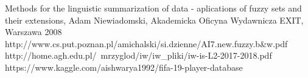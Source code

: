 \documentclass{classrep}
\begin{document}
	

\begin{thebibliography}{}
Methods for the linguistic summarization of data - aplications of fuzzy sets and their extensions, Adam Niewiadomski, Akademicka Oficyna Wydawnicza EXIT, Warszawa 2008
http://www.cs.put.poznan.pl/amichalski/si.dzienne/AI7.new.fuzzy.b&w.pdf
http://home.agh.edu.pl/~mrzyglod/iw/iw_pliki/iw-is-L2-2017-2018.pdf
https://www.kaggle.com/aishwarya1992/fifa-19-player-database
\end{thebibliography}
\end{document}

